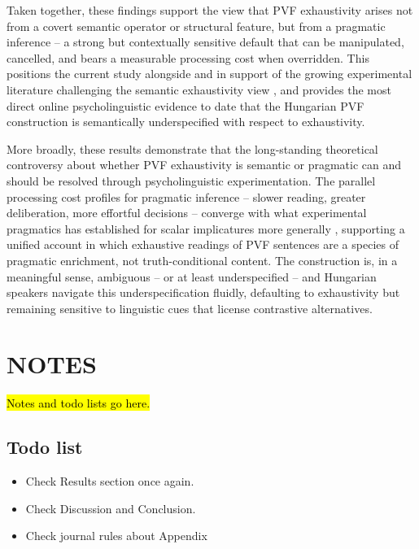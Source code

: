 \documentclass[a4paper, ruler]{CUP-JNL-LIN}%
\begin{document}
Taken together, these findings support the view that PVF exhaustivity arises not from a covert semantic operator or structural feature, but from a pragmatic inference -- a strong but contextually sensitive default that can be manipulated, cancelled, and bears a measurable processing cost when overridden. This positions the current study alongside and in support of the growing experimental literature challenging the semantic exhaustivity view \citep{onea_2009_hungarian,gerocs_2014_exhaustivity,kaldi_2018_linguistic,kaldi_2021_hungarian_preverbal}, and provides the most direct online psycholinguistic evidence to date that the Hungarian PVF construction is semantically underspecified with respect to exhaustivity.

More broadly, these results demonstrate that the long-standing theoretical controversy about whether PVF exhaustivity is semantic or pragmatic can and should be resolved through psycholinguistic experimentation. The parallel processing cost profiles for pragmatic inference -- slower reading, greater deliberation, more effortful decisions -- converge with what experimental pragmatics has established for scalar implicatures more generally \citep[cf.][]{kaldi_2021_hungarian_structural}, supporting a unified account in which exhaustive readings of PVF sentences are a species of pragmatic enrichment, not truth-conditional content. The construction is, in a meaningful sense, ambiguous -- or at least underspecified -- and Hungarian speakers navigate this underspecification fluidly, defaulting to exhaustivity but remaining sensitive to linguistic cues that license contrastive alternatives.



\section{NOTES}

\hl{Notes and todo lists go here.}

\subsection{Todo list}
\begin{itemize}
   \item Check Results section once again.
   \item Check Discussion and Conclusion.
   \item Check journal rules about Appendix
\end{itemize}
\end{document}
